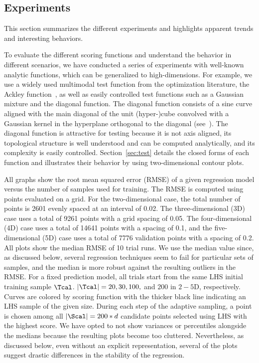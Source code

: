 \subsection{Experiments}
\label{sec:exp}

This section summarizes the different experiments and highlights apparent trends and interesting behaviors.

 To evaluate the different scoring functions and understand the behavior in different scenarios, we have conducted a series of experiments with well-known analytic functions, which can be generalized to high-dimensions.
%
For example, we use a widely used multimodal test function from the optimization literature, the Ackley function~\cite{Ackley1987}, as well as easily controlled test functions such as a Gaussian mixture and the diagonal function.
%
The diagonal function consists of a sine curve aligned with the main diagonal of the unit (hyper-)cube convolved with a Gaussian kernel in the hyperplane orthogonal to the diagonal (see~\cite{GerberBremerPascucci2010}).
%
The diagonal function is attractive for testing because it is not axis aligned, its topological structure is well understood and can be computed analytically, and its complexity is easily controlled.
%
Section~\ref{sec:test} details the closed forms of each function and illustrates their behavior by using two-dimensional contour plots.

All graphs show the root mean squared error (RMSE) of a given regression model versus the number of samples used for training.
%
The RMSE is computed using points evaluated on a grid.
%
For the two-dimensional case, the total number of points is 2601 evenly spaced at an interval of 0.02.
%
The three-dimensional (3D) case uses a total of 9261 points with a grid spacing of 0.05.
%
The four-dimensional (4D) case uses a total of 14641 points with a spacing of 0.1, and the five-dimensional (5D) case uses a total of 7776 validation points with a spacing of 0.2.
%
All plots show the median RMSE of 10 trial runs.
%
We use the median value since, as discussed below, several regression techniques seem to fail for particular sets of samples, and the median is more robust against the resulting outliers in the RMSE.
%
For a fixed prediction model, all trials start from the same LHS initial training sample $\Tcal$.
%
$|\Tcal| = 20, 30, 100,$ and $200$ in $2-5$D, respectively.
%
Curves are colored by scoring function with the thicker black line indicating an LHS sample of the given size.
%
During each step of the adaptive sampling, a point is chosen among all $|\Scal| =
200*d$ candidate points selected using LHS with the highest score.
%
We have opted to not show variances or percentiles alongside the medians because the resulting plots become too cluttered.
%
Nevertheless, as discussed below, even without an explicit representation, several of the plots suggest drastic differences in the stability of the regression.


